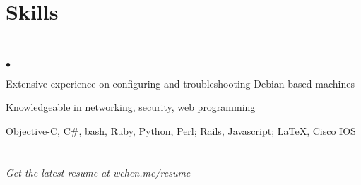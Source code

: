 \documentclass[margin,line]{res}
\newenvironment{list2}
  {\vspace{-4mm}
   \begin{list}{$\bullet$}{
     \setlength{\itemsep}{0in}
     \setlength{\parsep}{0in} \setlength{\parskip}{0in}
     \setlength{\topsep}{0in} \setlength{\partopsep}{0in}
     \setlength{\leftmargin}{0.18in}}}
  {\end{list}}
\begin{document}
\begin{resume}
%
%
\section{\sc Skills} 
\textcolor{white}{.}
\begin{list2}
\item Extensive experience on configuring and troubleshooting Debian-based machines
\item Knowledgeable in networking, security, web programming
\item Objective-C, C\#, bash, Ruby, Python, Perl; Rails, Javascript; \LaTeX, Cisco IOS
\end{list2}

%
%
\section{}
\textit{Get the latest resume at wchen.me/resume}


%
%




\end{resume}
\end{document}
